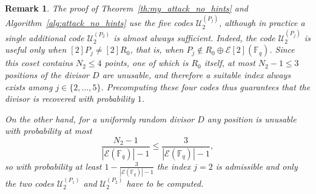 \documentclass[sn-mathphys-num]{sn-jnl_modified}
\newcommand{\FF}{\ensuremath{\mathbb{F}}}
\newtheorem{remark}{Remark}
\begin{document}
\begin{remark}\label{rem:number_of_codes}
The proof of Theorem~\ref{th:my_attack_no_hints} and Algorithm~\ref{alg:attack_no_hints} use the five codes $\mathcal{U}_2^{(P_j)}$, although in practice a single additional code $\mathcal{U}_2^{(P_2)}$ is almost always sufficient. Indeed, the code $\mathcal{U}_2^{(P_j)}$ is useful only when $[2]P_j \neq [2]R_0$, that is, when $P_j \notin R_0 \oplus \mathcal{E}[2](\FF_q)$. Since this coset contains $N_2 \leq 4$ points, one of which is $R_0$ itself, at most $N_2 - 1 \leq 3$ positions of the divisor $D$ are unusable, and therefore a suitable index always exists among $j \in \{2,\dots,5\}$. Precomputing these four codes thus guarantees that the divisor is recovered with probability $1$.

On the other hand, for a uniformly random divisor $D$ any position is unusable with probability at most
\[
\frac{N_2 - 1}{|\mathcal{E}(\FF_q)| - 1} \leq \frac{3}{|\mathcal{E}(\FF_q)| - 1},
\]
so with probability at least $1 - \frac{3}{|\mathcal{E}(\FF_q)|-1}$ the index $j = 2$ is admissible and only the two codes $\mathcal{U}_2^{(P_1)}$ and $\mathcal{U}_2^{(P_2)}$ have to be computed.
\end{remark}

























\end{document}
